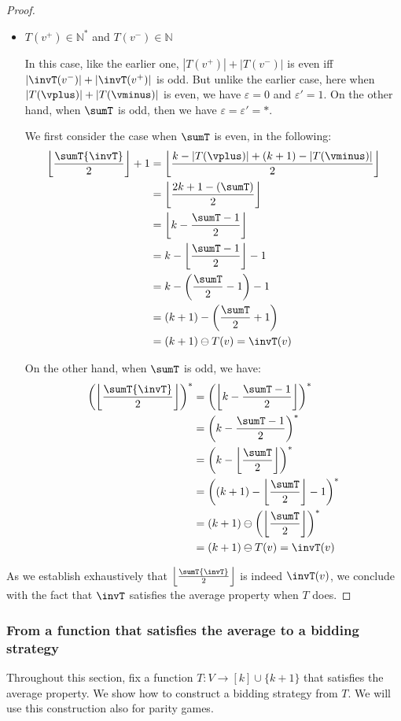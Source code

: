 \documentclass{article}\providecommand{\nequiv}{\not\equiv}\usepackage[a4paper,margin=20mm]{geometry}
\newcommand{\Nat}{\mathbb{N}}
\renewcommand{\set}[1]{\{ #1  \}}
\newcommand{\eps}{\varepsilon}
\DeclarePairedDelimiter{\adjustfloor}{\lfloor}{\rfloor}
\newcommand{\floor}[1]{\adjustfloor*{#1}}
\newcommand{\absolut}[1]{|#1|}
\begin{document}
\begin{proof}
\begin{itemize}
		\smallskip
		
		\item \(T(v^+) \in \Nat^*\) and \(T(v^-) \in \Nat\)
		
		In this case, like the earlier one,  \(|T(v^+)|+|T(v^-)|\) is even iff  \(|\invT(v^-)|+|\invT(v^+)|\) is odd.
		But unlike the earlier case, here when \(\absolut{T(\vplus)} + \absolut{T(\vminus)}\) is even, we have \(\eps = 0\) and \(\eps' = 1\).
		On the other hand, when \(\sumT\) is odd, then we have \(\eps = \eps' = *\). 
		
		We first consider the case when \(\sumT\) is even, in the following:
		\begin{align*}
			\floor{\frac{\sumT{\invT}}{2}} + 1  &= \floor{\frac{k - \absolut{T(\vplus)} + (k+1) - \absolut{T(\vminus)}}{2}}\\
			&= \floor{\frac{2k+1 - (\sumT)}{2}}\\
			&= \floor{k - \frac{\sumT - 1}{2}}\\
			&= k - \floor{\frac{\sumT - 1}{2}} - 1\\
			&= k - \left(\frac{\sumT}{2} - 1\right) - 1\\
			&= (k+1) - \left(\frac{\sumT}{2} + 1\right)\\
			&= (k+1) \ominus T(v) = \invT(v) 
		\end{align*}
	
	On the other hand, when \(\sumT\) is odd, we have:
	\begin{align*}
		\left(\floor{\frac{\sumT{\invT}}{2}}\right)^* &= \left(\floor{k - \frac{\sumT - 1}{2}}\right)^*\\
		&= \left(k - \frac{\sumT - 1}{2}\right)^*\\
		&= \left(k - \floor{\frac{\sumT}{2}}\right)^*\\
		&= \left((k+1) - \floor{\frac{\sumT}{2}} - 1\right)^*\\
		&= (k+1) \ominus \left(\floor{\frac{\sumT}{2}}\right)^*\\
		&= (k+1) \ominus T(v) = \invT(v) 
	\end{align*}
	\end{itemize}

As we establish exhaustively that \(\floor{\frac{\sumT{\invT}}{2}}\) is indeed \(\invT(v)\), we conclude with the fact that  \(\invT\) satisfies the average property when \(T\) does. 
\end{proof}




    \subsubsection{From a function that satisfies the average to a bidding strategy}
\label{sec:def-f_T}
Throughout this section, fix a function $T: V \rightarrow [k] \cup \set{k+1}$ that satisfies the average property. We show how to construct a bidding strategy from $T$. We will use this construction also for parity games. 
\end{document}
